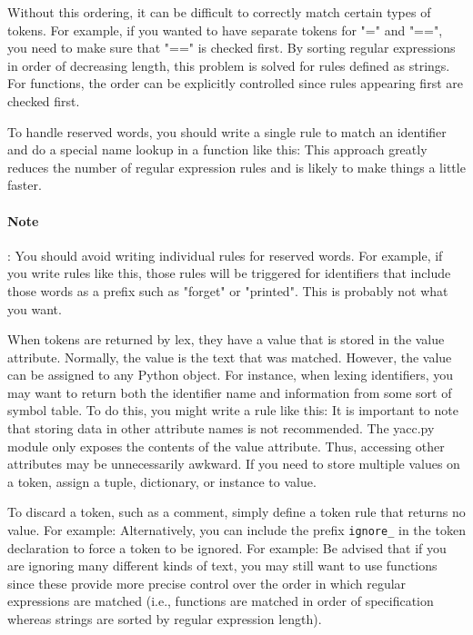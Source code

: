 Without this ordering, it can be difficult to correctly match certain types of
tokens. For example, if you wanted to have separate tokens for "=" and "==", you
need to make sure that "==" is checked first. By sorting regular expressions in
order of decreasing length, this problem is solved for rules defined as strings.
For functions, the order can be explicitly controlled since rules appearing
first are checked first.

To handle reserved words, you should write a single rule to match an identifier
and do a special name lookup in a function like this:
This approach greatly reduces the number of regular expression rules and is
likely to make things a little faster.

\paragraph{Note}: You should avoid writing individual rules for reserved words.
For example, if you write rules like this,
those rules will be triggered for identifiers that include those words as a
prefix such as "forget" or "printed". This is probably not what you want.


When tokens are returned by lex, they have a value that is stored in the value
attribute. Normally, the value is the text that was matched. However, the value
can be assigned to any Python object. For instance, when lexing identifiers, you
may want to return both the identifier name and information from some sort of
symbol table. To do this, you might write a rule like this:
It is important to note that storing data in other attribute names is not
recommended. The yacc.py module only exposes the contents of the value
attribute. Thus, accessing other attributes may be unnecessarily awkward. If you
need to store multiple values on a token, assign a tuple, dictionary, or
instance to value.


To discard a token, such as a comment, simply define a token rule that returns
no value. For example:
Alternatively, you can include the prefix \verb|ignore_| in the token
declaration to force a token to be ignored. For example:
Be advised that if you are ignoring many different kinds of text, you may still
want to use functions since these provide more precise control over the order in
which regular expressions are matched (i.e., functions are matched in order of
specification whereas strings are sorted by regular expression length).

